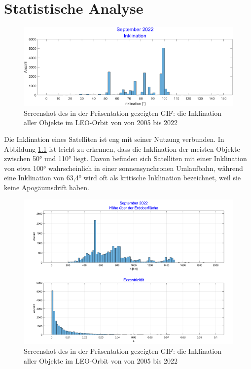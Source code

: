 \chapter{Statistische Analyse}
\begin{figure}[htbp]
	\centering
	\includegraphics[width=1\textwidth]{bilder/Inklination.png}
	\caption{Screenshot des in der Präsentation gezeigten GIF: die Inklination aller Objekte im LEO-Orbit von von 2005 bis 2022}
	\label{Inklination}
\end{figure}
Die Inklination eines Satelliten ist eng mit seiner Nutzung verbunden. In Abbildung \ref{Inklination} ist leicht zu erkennen, dass die Inklination der meisten Objekte zwischen 50° und 110° liegt. Davon befinden sich Satelliten mit einer Inklination von etwa 100° wahrscheinlich in einer sonnensynchronen Umlaufbahn, während eine Inklination von 63,4° wird oft als kritische Inklination bezeichnet, weil sie keine Apogäumsdrift haben.
\clearpage
\begin{figure}[htbp]
	\centering
	\includegraphics[width=1\textwidth]{bilder/Hoehe.png}
	\caption{Screenshot des in der Präsentation gezeigten GIF: die Inklination aller Objekte im LEO-Orbit von von 2005 bis 2022}
	\label{Hoehe}
\end{figure}
